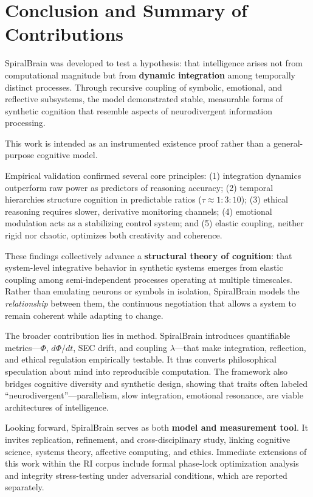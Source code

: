 \documentclass[11pt,a4paper]{article}
\begin{document}
\section{Conclusion and Summary of Contributions}
\label{sec:conclusion}

SpiralBrain was developed to test a hypothesis: that intelligence arises not from computational magnitude but from \textbf{dynamic integration} among temporally distinct processes.
Through recursive coupling of symbolic, emotional, and reflective subsystems, the model demonstrated stable, measurable forms of synthetic cognition that resemble aspects of neurodivergent information processing.

This work is intended as an instrumented existence proof rather than a general-purpose cognitive model.

Empirical validation confirmed several core principles:
(1) integration dynamics outperform raw power as predictors of reasoning accuracy;
(2) temporal hierarchies structure cognition in predictable ratios ($\tau \approx 1 : 3 : 10$);
(3) ethical reasoning requires slower, derivative monitoring channels;
(4) emotional modulation acts as a stabilizing control system; and
(5) elastic coupling, neither rigid nor chaotic, optimizes both creativity and coherence.

These findings collectively advance a \textbf{structural theory of cognition}: that system-level integrative behavior in synthetic systems emerges from elastic coupling among semi-independent processes operating at multiple timescales.
Rather than emulating neurons or symbols in isolation, SpiralBrain models the \textit{relationship} between them, the continuous negotiation that allows a system to remain coherent while adapting to change.

The broader contribution lies in method.
SpiralBrain introduces quantifiable metrics---$\Phi$, $d\Phi/dt$, SEC drift, and coupling $\lambda$---that make integration, reflection, and ethical regulation empirically testable.
It thus converts philosophical speculation about mind into reproducible computation.
The framework also bridges cognitive diversity and synthetic design, showing that traits often labeled ``neurodivergent''---parallelism, slow integration, emotional resonance, are viable architectures of intelligence.

Looking forward, SpiralBrain serves as both \textbf{model and measurement tool}.
It invites replication, refinement, and cross-disciplinary study, linking cognitive science, systems theory, affective computing, and ethics.
Immediate extensions of this work within the RI corpus include formal phase-lock optimization analysis and integrity stress-testing under adversarial conditions, which are reported separately.
\end{document}
